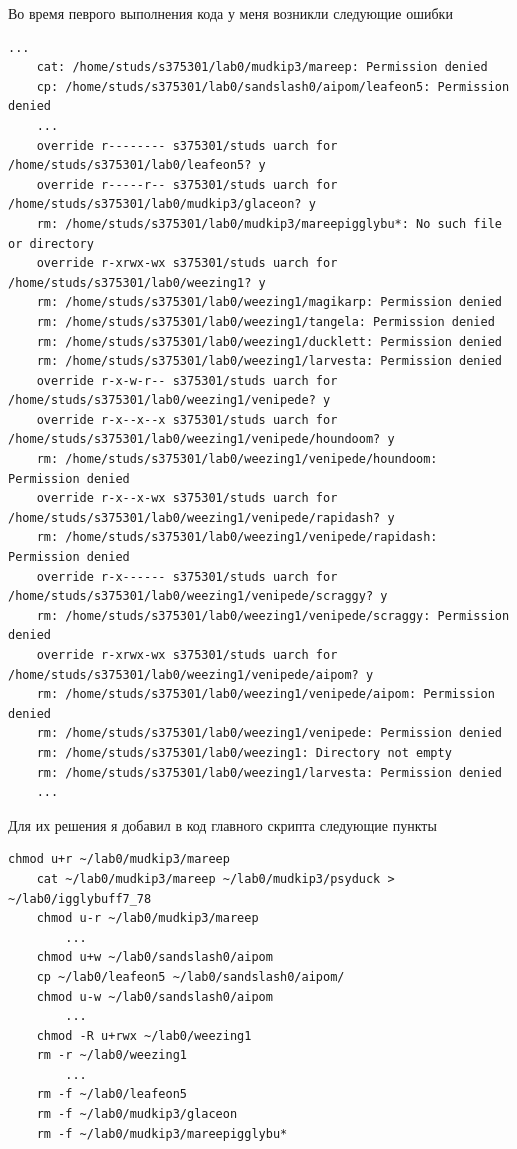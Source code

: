     Во время певрого выполнения кода у меня возникли следующие ошибки
    \begin{lstlisting}[caption={Ошибки при первом запуске},label={lst:result1}]
    ...
    cat: /home/studs/s375301/lab0/mudkip3/mareep: Permission denied
    cp: /home/studs/s375301/lab0/sandslash0/aipom/leafeon5: Permission denied
    ...
    override r-------- s375301/studs uarch for /home/studs/s375301/lab0/leafeon5? y
    override r-----r-- s375301/studs uarch for /home/studs/s375301/lab0/mudkip3/glaceon? y
    rm: /home/studs/s375301/lab0/mudkip3/mareepigglybu*: No such file or directory
    override r-xrwx-wx s375301/studs uarch for /home/studs/s375301/lab0/weezing1? y
    rm: /home/studs/s375301/lab0/weezing1/magikarp: Permission denied
    rm: /home/studs/s375301/lab0/weezing1/tangela: Permission denied
    rm: /home/studs/s375301/lab0/weezing1/ducklett: Permission denied
    rm: /home/studs/s375301/lab0/weezing1/larvesta: Permission denied
    override r-x-w-r-- s375301/studs uarch for /home/studs/s375301/lab0/weezing1/venipede? y
    override r-x--x--x s375301/studs uarch for /home/studs/s375301/lab0/weezing1/venipede/houndoom? y
    rm: /home/studs/s375301/lab0/weezing1/venipede/houndoom: Permission denied
    override r-x--x-wx s375301/studs uarch for /home/studs/s375301/lab0/weezing1/venipede/rapidash? y
    rm: /home/studs/s375301/lab0/weezing1/venipede/rapidash: Permission denied
    override r-x------ s375301/studs uarch for /home/studs/s375301/lab0/weezing1/venipede/scraggy? y
    rm: /home/studs/s375301/lab0/weezing1/venipede/scraggy: Permission denied
    override r-xrwx-wx s375301/studs uarch for /home/studs/s375301/lab0/weezing1/venipede/aipom? y
    rm: /home/studs/s375301/lab0/weezing1/venipede/aipom: Permission denied
    rm: /home/studs/s375301/lab0/weezing1/venipede: Permission denied
    rm: /home/studs/s375301/lab0/weezing1: Directory not empty
    rm: /home/studs/s375301/lab0/weezing1/larvesta: Permission denied
    ...
    \end{lstlisting}

    Для их решения я добавил в код главного скрипта следующие пункты
    \begin{lstlisting}[caption={Добавление изменения прав},label={lst:codeedit}]
    chmod u+r ~/lab0/mudkip3/mareep
    cat ~/lab0/mudkip3/mareep ~/lab0/mudkip3/psyduck > ~/lab0/igglybuff7_78
    chmod u-r ~/lab0/mudkip3/mareep
        ...
    chmod u+w ~/lab0/sandslash0/aipom
    cp ~/lab0/leafeon5 ~/lab0/sandslash0/aipom/
    chmod u-w ~/lab0/sandslash0/aipom
        ...
    chmod -R u+rwx ~/lab0/weezing1
    rm -r ~/lab0/weezing1
        ...
    rm -f ~/lab0/leafeon5
    rm -f ~/lab0/mudkip3/glaceon
    rm -f ~/lab0/mudkip3/mareepigglybu*

    \end{lstlisting}

